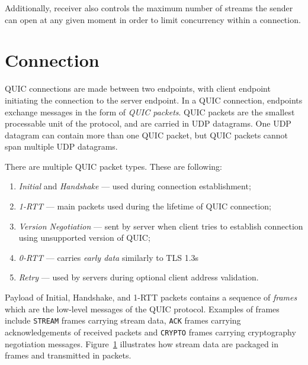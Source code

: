 Additionally, receiver also controls the maximum number of streams the sender can open at any given
moment in order to limit concurrency within a connection.

\section{Connection}

QUIC connections are made between two endpoints, with client endpoint initiating the connection to
the server endpoint. In a QUIC connection, endpoints exchange messages in the form of \textit{QUIC
packets}. QUIC packets are the smallest processable unit of the protocol, and are carried in UDP
datagrams. One UDP datagram can contain more than one QUIC packet, but QUIC packets cannot span
multiple UDP datagrams.

There are multiple QUIC packet types. These are following:

\begin{enumerate}
  \item \textit{Initial} and \textit{Handshake} --- used during connection establishment;
  \item \textit{1-RTT} --- main packets used during the lifetime of QUIC connection;
  \item \textit{Version Negotiation} --- sent by server when client tries to establish connection
    using unsupported version of QUIC\@;
  \item \textit{0-RTT} --- carries \textit{early data} similarly to TLS 1.3s 
  \item \textit{Retry} --- used by servers during optional  client address validation.
\end{enumerate}

Payload of Initial, Handshake, and 1-RTT packets contains a sequence of \textit{frames} which are
the low-level messages of the QUIC protocol. Examples of frames include \texttt{STREAM} frames
carrying stream data, \texttt{ACK} frames carrying acknowledgements of received packets and
\texttt{CRYPTO} frames carrying cryptography negotiation messages.
Figure~\ref{fig:streams-frames-and-packets} illustrates how stream data are packaged in frames and
transmitted in packets.

\begin{figure}[h]\label{fig:streams-frames-and-packets}
  \centering
\end{figure}

